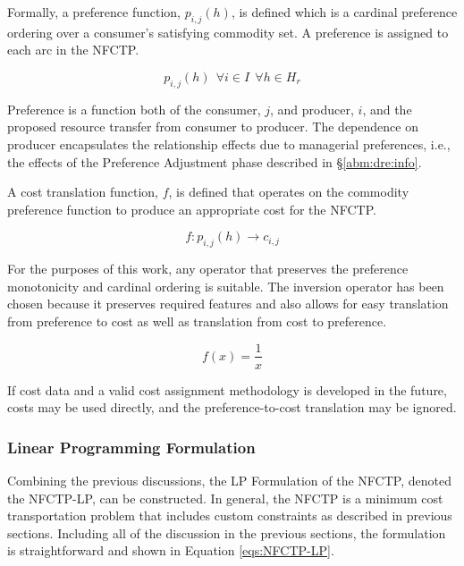 Formally, a preference function, $p_{i, j}(h)$, is defined which is a cardinal
preference ordering over a consumer's satisfying commodity set. A preference is
assigned to each arc in the NFCTP.

\begin{equation}
p_{i, j}(h) \:\: \forall i \in I  \:\: \forall h \in H_{r} 
\end{equation}

Preference is a function both of the consumer, $j$, and producer, $i$, and the
proposed resource transfer from consumer to producer. The dependence on producer
encapsulates the relationship effects due to managerial preferences, i.e., the
effects of the Preference Adjustment phase described in \S \ref{abm:dre:info}.

A cost translation function, $f$, is defined that operates on the commodity
preference function to produce an appropriate cost for the NFCTP.

\begin{equation}
f : p_{i,j}(h) \to c_{i,j}
\end{equation}

For the purposes of this work, any operator that preserves the preference
monotonicity and cardinal ordering is suitable.  The inversion operator has been
chosen because it preserves required features and also allows for easy
translation from preference to cost as well as translation from cost to
preference.

\begin{equation}
f(x) = \frac{1}{x}
\end{equation}

If cost data and a valid cost assignment methodology is developed in the future,
costs may be used directly, and the preference-to-cost translation may be
ignored.

\subsubsection{Linear Programming Formulation}\label{abm:dre:lp}

Combining the previous discussions, the LP Formulation of the NFCTP, denoted the
NFCTP-LP, can be constructed. In general, the NFCTP is a minimum cost
transportation problem that includes custom constraints as described in previous
sections. Including all of the discussion in the previous sections, the
formulation is straightforward and shown in Equation \ref{eqs:NFCTP-LP}.

